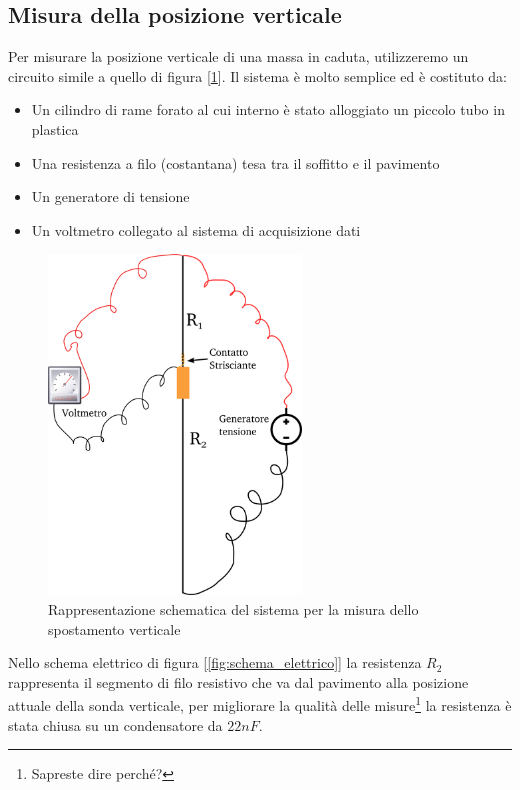 \documentclass[a4paper,10pt,oneside]{article}
\begin{document}
\subsection*{Misura della posizione verticale}
Per misurare la posizione verticale di una massa in caduta, utilizzeremo un circuito simile a quello di figura [\ref{fig:misura_verticale}]. Il sistema è molto semplice ed è costituto da:
\begin{itemize}
 \item Un cilindro di rame forato al cui interno è stato alloggiato un piccolo tubo in plastica
 \item Una resistenza a filo (costantana) tesa tra il soffitto e il pavimento
 \item Un generatore di tensione
 \item Un voltmetro collegato al sistema di acquisizione dati 
\end{itemize}
\begin{figure}[H]
 \centering
 \includegraphics[width=0.6\textwidth]{./Immagini/misura_posizione_verticale.png}
\caption{Rappresentazione schematica del sistema per la misura dello spostamento verticale} \label{fig:misura_verticale}
\end{figure}
Nello schema elettrico di figura [\ref{fig:schema_elettrico}] la resistenza $R_2$ rappresenta il segmento di filo resistivo che va dal pavimento alla posizione attuale della sonda verticale, per migliorare la qualità delle misure\footnote{Sapreste dire perché?} la resistenza è stata chiusa su un condensatore da $22nF$.
\end{document}
